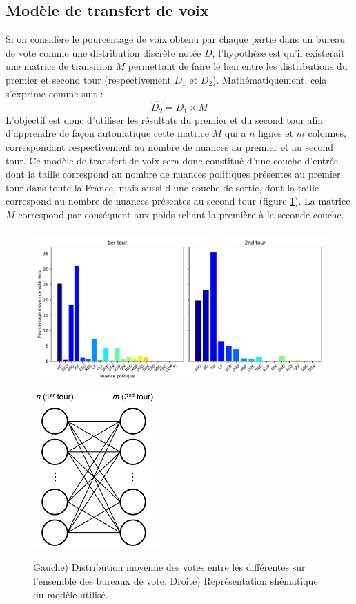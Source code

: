\documentclass[11pt]{article}
\begin{document}
        \subsection*{Modèle de transfert de voix}
            Si on considère le pourcentage de voix obtenu par chaque partie dans un bureau de vote comme une distribution discrète notée $D$, l'hypothèse est qu'il existerait une matrice de transition $M$ permettant de faire le lien entre les distributions du premier et second tour (respectivement $D_1$ et $D_2$). Mathématiquement, cela s'exprime comme suit :
            \begin{equation}
                \hat{D_2} = D_1 \times M
            \end{equation}
            L'objectif est donc d'utiliser les résultats du premier et du second tour afin d'apprendre de façon automatique cette matrice $M$ qui a $n$ lignes et $m$ colonnes, correspondant respectivement au nombre de nuances au premier et au second tour. Ce modèle de transfert de voix sera donc constitué d'une couche d'entrée dont la taille correspond au nombre de nuances politiques présentes au premier tour dans toute la France, mais aussi d'une couche de sortie, dont la taille correspond au nombre de nuances présentes au second tour (figure \ref{fig:Model}). La matrice $M$ correspond par conséquent aux poids reliant la première à la seconde couche. 
            
            \begin{figure}
                \begin{center}
                    \includegraphics[height=6cm]{Distribution_votes_1er_et_2nd_tour.pdf}
                    \includegraphics[height=6cm]{Model_transfert_Voix.png}
                    \caption{Gauche) Distribution moyenne des votes entre les différentes sur l'ensemble des bureaux de vote. Droite) Représentation shématique du modèle utilisé.}
                    \label{fig:Model}
                \end{center}
            \end{figure}
\end{document}
